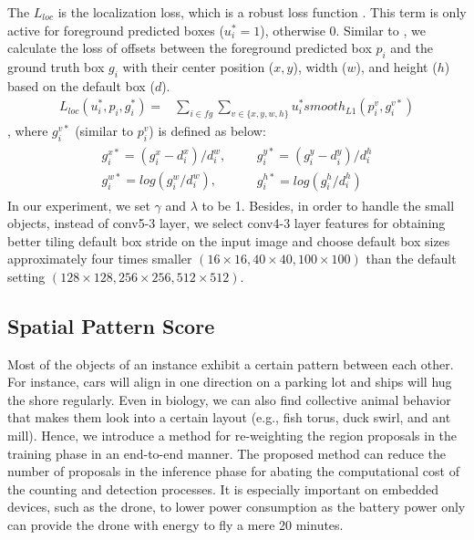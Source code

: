 \documentclass[10pt,twocolumn,letterpaper]{article}
\begin{document}
The $L_{loc}$ is the localization loss, which is a robust loss function \cite{20_girshick2015fast}. This term is only active for foreground predicted boxes ($u_{i}^{*} = 1$), otherwise $0$. Similar to \cite{21_ren2015faster}, we calculate the loss of offsets between the foreground predicted box $p_{i}$ and the ground truth box $g_{i}$ with their center position ($x, y$), width ($w$), and height ($h$) based on the default box ($d$).
\begin{equation} \label{eq:Llos}
\begin{aligned}
L_{loc}(u_{i}^{*}, p_{i}, g_{i}^{*}) =& \sum_{i \in fg} \sum_{v \in \{x, y, w, h\}} u_{i}^{*}smooth_{L1}(p_{i}^{v}, g_{i}^{v*})
\end{aligned}
\end{equation}
, where $g_{i}^{v*}$ (similar to $p_{i}^{v}$) is defined as below:
\begin{align}
  \begin{aligned}
   g_{i}^{x*} = (g_{i}^{x} - d_{i}^{x}) / d_{i}^{w}, \\       g_{i}^{w*} = log(g_{i}^{w} / d_{i}^{w}),
  \end{aligned}
  &&
  \begin{aligned}
   g_{i}^{y*} = (g_{i}^{y} - d_{i}^{y}) / d_{i}^{h} \\       g_{i}^{h*} = log(g_{i}^{h} / d_{i}^{h})
  \end{aligned}
 \end{align}
In our experiment, we set $\gamma$ and $\lambda$ to be 1. Besides, in order to handle the small objects, instead of conv5-3 layer, we select conv4-3 layer features for obtaining better tiling default box stride on the input image and choose default box sizes approximately four times smaller $(16\times16, 40\times40, 100\times100)$ than the default setting $(128\times128, 256\times256, 512\times512)$.


\subsection{Spatial Pattern Score} \label{sec:SPScore}
Most of the objects of an instance exhibit a certain pattern between each other. For instance, cars will align in one direction on a parking lot and ships will hug the shore regularly. Even in biology, we can also find collective animal behavior that makes them look into a certain layout (e.g., fish torus, duck swirl, and ant mill). Hence, we introduce a method for re-weighting the region proposals in the training phase in an end-to-end manner. The proposed method can reduce the number of proposals in the inference phase for abating the computational cost of the counting and detection processes. It is especially important on embedded devices, such as the drone, to lower power consumption as the battery power only can provide the drone with energy to fly a mere 20 minutes.
\end{document}
